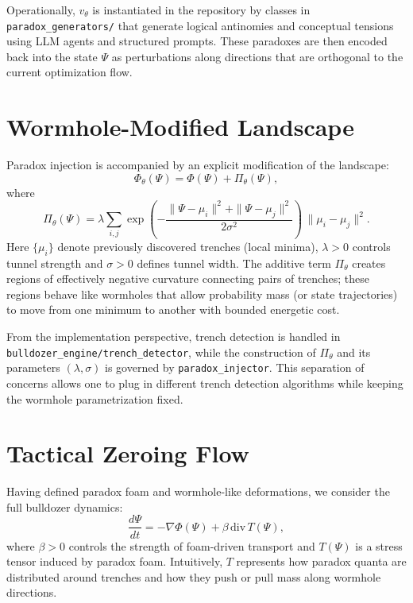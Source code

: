 \documentclass[11pt]{article}
\begin{document}
Operationally, $v_{\theta}$ is instantiated in the repository by classes in \texttt{paradox\_generators/} that generate logical antinomies and conceptual tensions using LLM agents and structured prompts. 
These paradoxes are then encoded back into the state $\Psi$ as perturbations along directions that are orthogonal to the current optimization flow.

\section{Wormhole-Modified Landscape}

Paradox injection is accompanied by an explicit modification of the landscape:
\begin{equation}
    \Phi_{\theta}(\Psi) = \Phi(\Psi) + \Pi_{\theta}(\Psi),
\end{equation}
where
\begin{equation}
    \Pi_{\theta}(\Psi)
    = \lambda \sum_{i,j} 
    \exp\left(
    - \frac{\|\Psi - \mu_i\|^2 + \|\Psi - \mu_j\|^2}{2\sigma^2}
    \right) 
    \, \|\mu_i - \mu_j\|^2.
\end{equation}
Here $\{\mu_i\}$ denote previously discovered trenches (local minima), $\lambda > 0$ controls tunnel strength and $\sigma > 0$ defines tunnel width. 
The additive term $\Pi_{\theta}$ creates regions of effectively negative curvature connecting pairs of trenches; these regions behave like wormholes that allow probability mass (or state trajectories) to move from one minimum to another with bounded energetic cost.

From the implementation perspective, trench detection is handled in \texttt{bulldozer\_engine/trench\_detector}, while the construction of $\Pi_{\theta}$ and its parameters $(\lambda,\sigma)$ is governed by \texttt{paradox\_injector}. 
This separation of concerns allows one to plug in different trench detection algorithms while keeping the wormhole parametrization fixed.

\section{Tactical Zeroing Flow}

Having defined paradox foam and wormhole-like deformations, we consider the full bulldozer dynamics:
\begin{equation}
    \frac{d\Psi}{dt} 
    = - \nabla \Phi(\Psi) + \beta \, \mathrm{div} \, T(\Psi),
\end{equation}
where $\beta > 0$ controls the strength of foam-driven transport and $T(\Psi)$ is a stress tensor induced by paradox foam. 
Intuitively, $T$ represents how paradox quanta are distributed around trenches and how they push or pull mass along wormhole directions.
\end{document}
